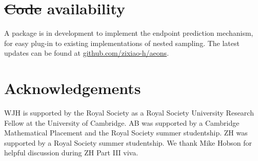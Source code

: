 \documentclass[usenatbib]{mnras}
\providecommand{\DIFaddtex}[1]{{\protect\color{blue}\uwave{#1}}} %
\providecommand{\DIFdeltex}[1]{{\protect\color{red}\sout{#1}}}                      %
\providecommand{\DIFaddbegin}{} %
\providecommand{\DIFaddend}{} %
\providecommand{\DIFdelbegin}{} %
\providecommand{\DIFdelend}{} %
\providecommand{\DIFadd}[1]{\texorpdfstring{\DIFaddtex{#1}}{#1}} %
\providecommand{\DIFdel}[1]{\texorpdfstring{\DIFdeltex{#1}}{}} %
\newcommand{\DIFscaledelfig}{0.5}
\newlength{\DIFdelgraphicswidth} %
\newlength{\DIFdelgraphicsheight} %
\newcommand{\DIFaddincludegraphics}[2][]{{\color{blue}\fbox{\DIFOincludegraphics[#1]{#2}}}} %
\newcommand{\DIFdelincludegraphics}[2][]{%
\sbox{\DIFdelgraphicsbox}{\DIFOincludegraphics[#1]{#2}}%
\settoboxwidth{\DIFdelgraphicswidth}{\DIFdelgraphicsbox} %
\settoboxtotalheight{\DIFdelgraphicsheight}{\DIFdelgraphicsbox} %
\scalebox{\DIFscaledelfig}{%
\parbox[b]{\DIFdelgraphicswidth}{\usebox{\DIFdelgraphicsbox}\\[-\baselineskip] \rule{\DIFdelgraphicswidth}{0em}}\llap{\resizebox{\DIFdelgraphicswidth}{\DIFdelgraphicsheight}{%
\setlength{\unitlength}{\DIFdelgraphicswidth}%
\begin{picture}(1,1)%
\thicklines\linethickness{2pt} %
{\color[rgb]{1,0,0}\put(0,0){\framebox(1,1){}}}%
{\color[rgb]{1,0,0}\put(0,0){\line( 1,1){1}}}%
{\color[rgb]{1,0,0}\put(0,1){\line(1,-1){1}}}%
\end{picture}%
}\hspace*{3pt}}} %
} %
\DeclareRobustCommand{\DIFaddbegin}{\DIFOaddbegin \let\includegraphics\DIFaddincludegraphics} %
\DeclareRobustCommand{\DIFaddend}{\DIFOaddend \let\includegraphics\DIFOincludegraphics} %
\DeclareRobustCommand{\DIFdelbegin}{\DIFOdelbegin \let\includegraphics\DIFdelincludegraphics} %
\DeclareRobustCommand{\DIFdelend}{\DIFOaddend \let\includegraphics\DIFOincludegraphics} %
\begin{document}
\section*{\DIFdelbegin \DIFdel{Code }\DIFdelend \DIFaddbegin \DIFadd{Data }\DIFaddend availability}
A package is in development to implement the endpoint prediction mechanism, for easy plug-in to existing implementations of nested sampling. The latest updates can be found at \href{https://github.com/zixiao-h/aeons}{github.com/zixiao-h/aeons}.

\section*{Acknowledgements}
WJH is supported by the Royal Society as a Royal Society University Research Fellow at the University of Cambridge. AB was supported by a Cambridge Mathematical Placement and the Royal Society summer studentship. ZH was supported by a Royal Society summer studentship. We thank Mike Hobson for helpful discussion during ZH Part III viva.




\label{lastpage}
\end{document}
